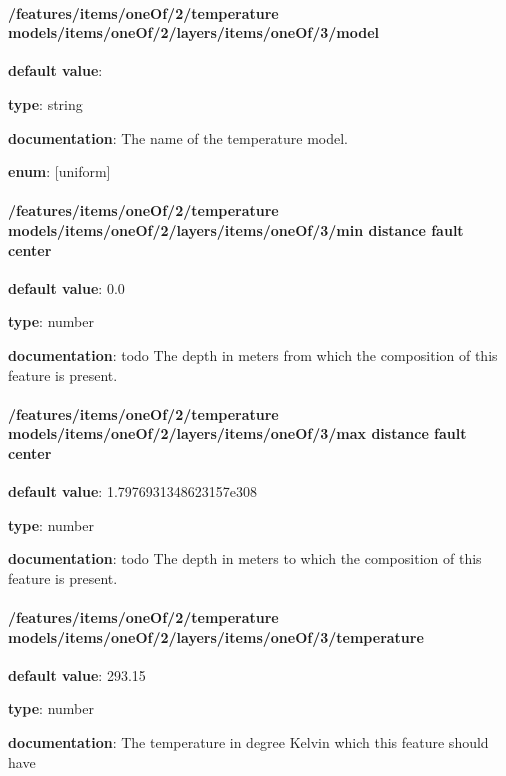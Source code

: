 \paragraph{/features/items/oneOf/2/temperature models/items/oneOf/2/layers/items/oneOf/3/model} \begin{itemized}
\item {\bf default value}: 
\item {\bf type}: string
\item {\bf documentation}: The name of the temperature model.
\item {\bf enum}: [uniform]\end{itemized}\paragraph{/features/items/oneOf/2/temperature models/items/oneOf/2/layers/items/oneOf/3/min distance fault center} \begin{itemized}
\item {\bf default value}: 0.0
\item {\bf type}: number
\item {\bf documentation}: todo The depth in meters from which the composition of this feature is present.
\end{itemized}\paragraph{/features/items/oneOf/2/temperature models/items/oneOf/2/layers/items/oneOf/3/max distance fault center} \begin{itemized}
\item {\bf default value}: 1.7976931348623157e308
\item {\bf type}: number
\item {\bf documentation}: todo The depth in meters to which the composition of this feature is present.
\end{itemized}\paragraph{/features/items/oneOf/2/temperature models/items/oneOf/2/layers/items/oneOf/3/temperature} \begin{itemized}
\item {\bf default value}: 293.15
\item {\bf type}: number
\item {\bf documentation}: The temperature in degree Kelvin which this feature should have

\end{itemized}
